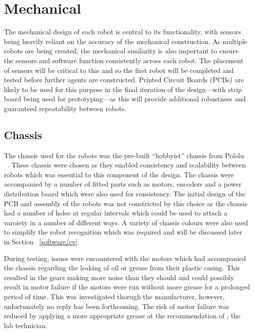 
\chapter{Mechanical}\label{mechanical}

The mechanical design of each robot is central to its functionality, with sensors being heavily 
reliant on the accuracy of the mechanical construction. As multiple robots are being created, 
the mechanical similarity is also important to ensure the sensors and software function consistently across each robot. The placement of sensors will be critical to this and
so the first robot will be completed and tested before further agents are constructed.
Printed Circuit Boards (PCBs) are likely to be used for this purpose in the
final iteration of the design---with strip board being used for prototyping---as this will provide additional robustness and guaranteed repeatability between robots.

\section{Chassis}\label{mech/chassis}
The chassis used for the robots was the pre-built ``hobbyist'' chassis from Pololu ~\cite{pololuchassis}. These chassis were chosen as they enabled consistency and scalability between robots which was essential to this component of the design. The chassis were accompanied by a number of fitted parts such as motors, encoders and a power distribution board which were also used for consistency. The initial design of the PCB and assembly of the robots was not constricted by this choice as the chassis had a number of holes at regular intervals which could be used to attach a varoiety in a number of different ways. A variety of chassis colours were also used to simplify the robot recognition which was required and will be discussed later in Section ~\ref{software/cv}. 

During testing, issues were encountered with the motors which had accompanied the chassis regarding the leaking of oil or grease from their plastic casing. This resulted in the gears making more noise than they should and could possibly result in motor failure if the motors were run without more grease for a prolonged period of time. This was investigated thorugh the manufacturer, however, unfortunately no reply has been forthcoming. The risk of motor failure was reduced by applying a more appropriate grease at the recommendation of , the lab technician.  



